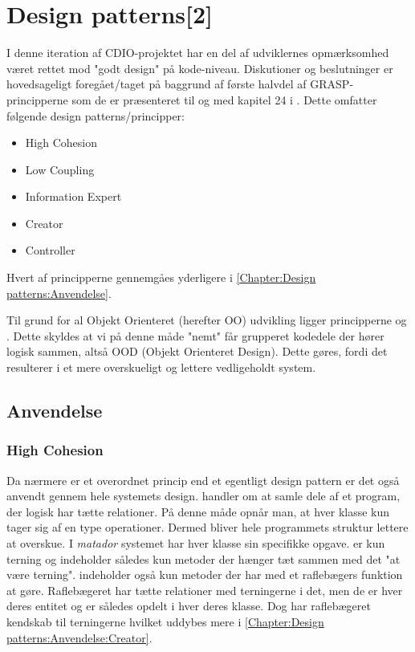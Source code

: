 \chapter{Design patterns[2]}\label{Chapter:Design patterns}
I denne iteration af CDIO-projektet \cite{CDIOdel2} har en del af udviklernes opmærksomhed været rettet mod "godt design" på kode-niveau. Diskutioner og beslutninger er hovedsageligt foregået/taget på baggrund af første halvdel af GRASP-principperne som de er præsenteret til og med kapitel 24 i \cite{umlbook}. Dette omfatter følgende design patterns/principper: 

\begin{itemize}
	\item High Cohesion    
	\item Low Coupling
	\item Information Expert
	\item Creator
	\item Controller
\end{itemize}





Hvert af principperne gennemgåes yderligere i \vref{Chapter:Design patterns:Anvendelse}.

Til grund for al Objekt Orienteret (herefter OO) udvikling ligger principperne  og . Dette skyldes at vi på denne måde "nemt" får grupperet kodedele der hører logisk sammen, altså OOD (Objekt Orienteret Design). Dette gøres, fordi det resulterer i et mere overskueligt og lettere vedligeholdt system.

 
\section{Anvendelse}\label{Chapter:Design patterns:Anvendelse}

\subsection{High Cohesion}\label{Chapter:Design patterns:Anvendelse:High Cohesion}
Da  nærmere er et overordnet princip end et egentligt design pattern er det også anvendt gennem hele systemets design.  handler om at samle dele af et program, der logisk har tætte relationer. På denne måde opnår man, at hver klasse kun tager sig af en type operationer. Dermed bliver hele programmets struktur lettere at overskue. I \textit{matador} systemet har hver klasse sin specifikke opgave.  er kun terning og indeholder således kun metoder der hænger tæt sammen med det "at være terning".  indeholder også kun metoder der har med et raflebægers funktion at gøre. Raflebægeret har tætte relationer med terningerne i det, men de er hver deres entitet og er således opdelt i hver deres klasse. Dog har raflebægeret kendskab til terningerne hvilket uddybes mere i \vref{Chapter:Design patterns:Anvendelse:Creator}.       

